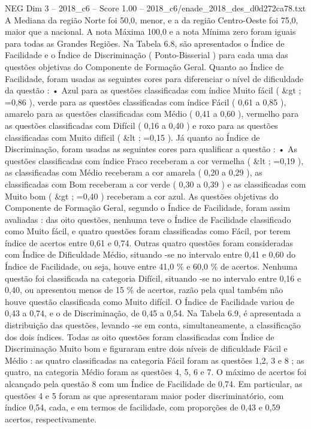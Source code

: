 \begin{textsample}{NEG Dim 3 – 2018\_c6 – Score 1.00 – 2018\_c6/enade\_2018\_des\_d0d272ca78.txt}
A Mediana da região Norte foi 50,0, menor, e a da região Centro-Oeste foi 75,0, maior que a nacional.
A nota Máxima 100,0 e a nota Mínima zero foram iguais para todas as Grandes Regiões.
Na Tabela 6.8, são apresentados o Índice de Facilidade e o Índice de Discriminação ( Ponto-Bisserial ) para cada uma das questões objetivas do Componente de Formação Geral.
Quanto ao Índice de Facilidade, foram usadas as seguintes cores para diferenciar o nível de dificuldade da questão : • Azul para as questões classificadas com índice Muito fácil ( \&gt ; =0,86 ), verde para as questões classificadas com índice Fácil ( 0,61 a 0,85 ), amarelo para as questões classificadas com Médio ( 0,41 a 0,60 ), vermelho para as questões classificadas com Difícil ( 0,16 a 0,40 ) e roxo para as questões classificadas com Muito difícil ( \&lt ; =0,15 ).
Já quanto ao Índice de Discriminação, foram usadas as seguintes cores para qualificar a questão : • As questões classificadas com índice Fraco receberam a cor vermelha ( \&lt ; =0,19 ), as classificadas com Médio receberam a cor amarela ( 0,20 a 0,29 ), as classificadas com Bom receberam a cor verde ( 0,30 a 0,39 ) e as classificadas com Muito bom ( \&gt ; =0,40 ) receberam a cor azul.
As questões objetivas do Componente de Formação Geral, segundo o Índice de Facilidade, foram assim avaliadas : das oito questões, nenhuma teve o Índice de Facilidade classificado como Muito fácil, e quatro questões foram classificadas como Fácil, por terem índice de acertos entre 0,61 e 0,74.
Outras quatro questões foram consideradas com Índice de Dificuldade Médio, situando -se no intervalo entre 0,41 e 0,60 do Índice de Facilidade, ou seja, houve entre 41,0 \% e 60,0 \% de acertos.
Nenhuma questão foi classificada na categoria Difícil, situando -se no intervalo entre 0,16 e 0,40, ou apresentou menos de 15 \% de acertos, razão pela qual também não houve questão classificada como Muito difícil.
O Índice de Facilidade variou de 0,43 a 0,74, e o de Discriminação, de 0,45 a 0,54.
Na Tabela 6.9, é apresentada a distribuição das questões, levando -se em conta, simultaneamente, a classificação dos dois índices.
Todas as oito questões foram classificadas com Índice de Discriminação Muito bom e figuraram entre dois níveis de dificuldade Fácil e Médio : as quatro classificadas na categoria Fácil foram as questões 1,2, 3 e 8 ; as quatro, na categoria Médio foram as questões 4, 5, 6 e 7.
O máximo de acertos foi alcançado pela questão 8 com um Índice de Facilidade de 0,74.
Em particular, as questões 4 e 5 foram as que apresentaram maior poder discriminatório, com índice 0,54, cada, e em termos de facilidade, com proporções de 0,43 e 0,59 acertos, respectivamente.

\end{textsample}
